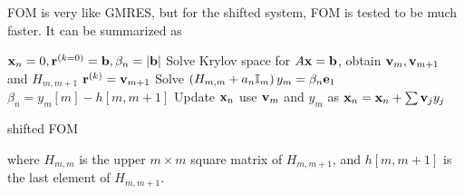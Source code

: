 FOM is very like GMRES, but \textcolor[rgb]{0,0,1}{for the shifted system, FOM is tested to be much faster}. It can be summarized as~\cite{shiftedFOM}
\begin{algorithm}[H]
\begin{algorithmic}
\State ${\bf x}_n=0,{\bf r}^{(k=0)}={\bf b},\beta _n=|{\bf b}|$
    \State Solve Krylov space for $A{\bf x}={\bf b}$, obtain ${\bf v}_m,{\bf v}_{m+1}$ and $H_{m,m+1}$
    \State ${\bf r}^{(k)}={\bf v}_{m+1}$
            \State Solve $\left(H_{m,m}+a_n \mathbb{I}_m\right)y_m=\beta _n {\bf e}_1$
            \State $\beta _n = y_m[m] - h[m,m+1]$
            \State Update ${\bf x}_n$ use ${\bf v}_m$ and $y_m$ as ${\bf x}_n={\bf x}_n+\sum {\bf v}_j y_j$
        \EndIf
    \EndFor
\EndFor
\end{algorithmic}
\caption{\label{alg.FOM.shifted}shifted FOM}
\end{algorithm}
where $H_{m,m}$ is the upper $m\times m$ square matrix of $H_{m,m+1}$, and $h[m,m+1]$ is the last element of $H_{m,m+1}$.
